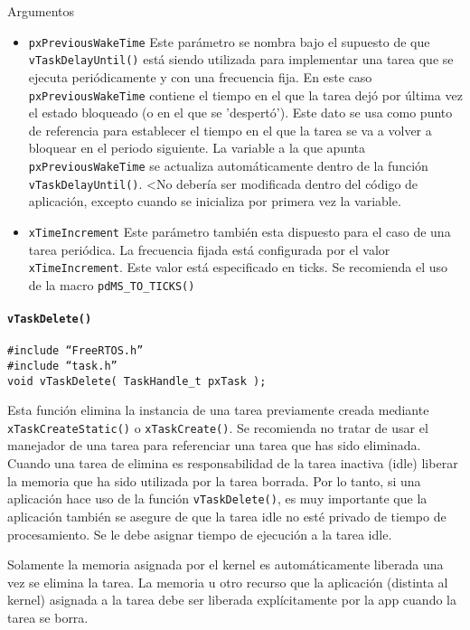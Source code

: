 Argumentos

\begin{itemize}
    \item \texttt{pxPreviousWakeTime} Este parámetro se nombra bajo el supuesto de que \texttt{vTaskDelayUntil()} está siendo utilizada para implementar una tarea que se ejecuta periódicamente y con una frecuencia fija. En este caso \texttt{pxPreviousWakeTime} contiene el tiempo en el que la tarea dejó por última vez el estado bloqueado (o en el que se 'despertó'). Este dato se usa como punto de referencia para establecer el tiempo en el que la tarea se va a volver a bloquear en el periodo siguiente.
    La variable a la que apunta \texttt{pxPreviousWakeTime} se actualiza automáticamente dentro de la función \texttt{vTaskDelayUntil()}. <No debería ser modificada dentro del código de aplicación, excepto cuando se inicializa por primera vez la variable.
    \item \texttt{xTimeIncrement} Este parámetro también esta dispuesto para el caso de una tarea periódica. La frecuencia fijada está configurada por el valor \texttt{xTimeIncrement}. Este valor está especificado en ticks. Se recomienda el uso de la macro \texttt{pdMS\_TO\_TICKS()}
\end{itemize}



\paragraph{\texttt{vTaskDelete()}}

\begin{verbatim}
#include “FreeRTOS.h”
#include “task.h”
void vTaskDelete( TaskHandle_t pxTask );
\end{verbatim}

Esta función elimina la instancia de una tarea previamente creada mediante \texttt{xTaskCreateStatic()} o \texttt{xTaskCreate()}. Se recomienda no tratar de usar el manejador de una tarea para referenciar una tarea que has sido eliminada.\\

Cuando una tarea de elimina es responsabilidad de la tarea inactiva (idle) liberar la memoria que ha sido utilizada por la tarea borrada. Por lo tanto, si una aplicación hace uso de la función \texttt{vTaskDelete()}, es muy importante que la aplicación también se asegure de que la tarea idle no esté privado de tiempo de procesamiento. Se le debe asignar tiempo de ejecución a la tarea idle.

Solamente la memoria asignada por el kernel es automáticamente liberada una vez se elimina la tarea. La memoria u otro recurso que la aplicación (distinta al kernel) asignada a la tarea debe ser liberada explícitamente por la app cuando la tarea se borra.

